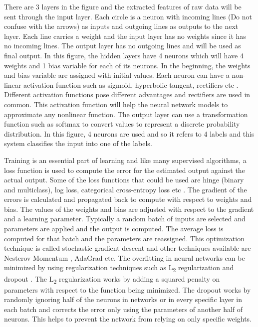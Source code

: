 \documentclass[a4paper, 11pt]{article}
\begin{document}
There are 3 layers in the figure and the extracted features of raw data will be sent through the input layer. Each circle is a neuron with incoming lines (Do not confuse with the arrows) as inputs and outgoing lines as outputs to the next layer. Each line carries a weight and the input layer has no weights since it has no incoming lines. The output layer has no outgoing lines and will be used as final output. In this figure, the hidden layers have 4 neurons which will have 4 weights and 1 bias variable for each of its neurons. In the beginning, the weights and bias variable are assigned with initial values. Each neuron can have a non-linear activation function such as sigmoid, hyperbolic tangent, rectifiers etc \cite{Goldberg2016}. Different activation functions pose different advantages and rectifiers are used in common. This activation function will help the neural network models to approximate any nonlinear function. The output layer can use a transformation function such as softmax to convert values to represent a discrete probability distribution. In this figure, 4 neurons are used and so it refers to 4 labels and this system classifies the input into one of the labels.

Training is an essential part of learning and like many supervised algorithms, a loss function is used to compute the error for the estimated output against the actual output. Some of the loss functions that could be used are hinge (binary and multiclass), log loss, categorical cross-entropy loss etc \cite{Goldberg2016}. The gradient of the errors is calculated and propagated back to compute with respect to weights and bias. The values of the weights and bias are adjusted with respect to the gradient and a learning parameter. Typically a random batch of inputs are selected and parameters are applied and the output is computed. The average loss is computed for that batch and the parameters are reassigned. This optimization technique is called stochastic gradient descent \cite{Bottou2012} and other techniques available are Nesterov Momentum \cite{Sutskever2013}, AdaGrad \cite{Duchi2011} etc. The overfitting in neural networks can be minimized by using regularization techniques such as L\textsubscript{2} regularization and dropout \cite{Hinton2012}. The L\textsubscript{2} regularization works by adding a squared penalty on parameters with respect to the function being minimized. The dropout works by randomly ignoring half of the neurons in networks or in every specific layer in each batch and corrects the error only using the parameters of another half of neurons. This helps to prevent the network from relying on only specific weights. 
\end{document}
